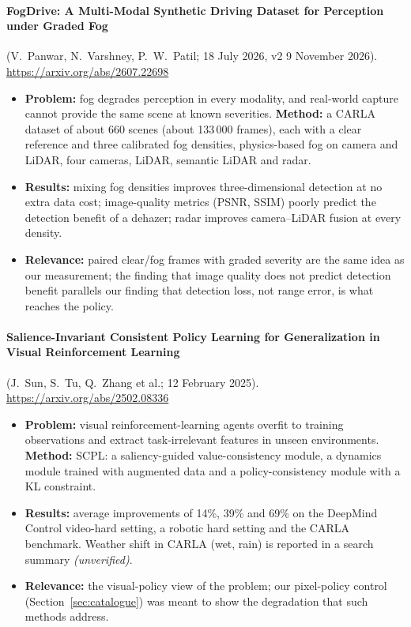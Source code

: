 \paragraph{FogDrive: A Multi-Modal Synthetic Driving Dataset for Perception under Graded Fog} (V.~Panwar, N.~Varshney, P.~W.~Patil; 18 July 2026, v2 9 November 2026). \url{https://arxiv.org/abs/2607.22698}
\begin{itemize}
\item \textbf{Problem:} fog degrades perception in every modality, and real-world capture cannot provide the same scene at known severities. \textbf{Method:} a CARLA dataset of about 660 scenes (about 133\,000 frames), each with a clear reference and three calibrated fog densities, physics-based fog on camera and LiDAR, four cameras, LiDAR, semantic LiDAR and radar.
\item \textbf{Results:} mixing fog densities improves three-dimensional detection at no extra data cost; image-quality metrics (PSNR, SSIM) poorly predict the detection benefit of a dehazer; radar improves camera--LiDAR fusion at every density.
\item \textbf{Relevance:} paired clear/fog frames with graded severity are the same idea as our measurement; the finding that image quality does not predict detection benefit parallels our finding that detection loss, not range error, is what reaches the policy.
\end{itemize}

\paragraph{Salience-Invariant Consistent Policy Learning for Generalization in Visual Reinforcement Learning} (J.~Sun, S.~Tu, Q.~Zhang et al.; 12 February 2025). \url{https://arxiv.org/abs/2502.08336}
\begin{itemize}
\item \textbf{Problem:} visual reinforcement-learning agents overfit to training observations and extract task-irrelevant features in unseen environments. \textbf{Method:} SCPL: a saliency-guided value-consistency module, a dynamics module trained with augmented data and a policy-consistency module with a KL constraint.
\item \textbf{Results:} average improvements of 14\%, 39\% and 69\% on the DeepMind Control video-hard setting, a robotic hard setting and the CARLA benchmark. Weather shift in CARLA (wet, rain) is reported in a search summary \emph{(unverified)}.
\item \textbf{Relevance:} the visual-policy view of the problem; our pixel-policy control (Section~\ref{sec:catalogue}) was meant to show the degradation that such methods address.
\end{itemize}

